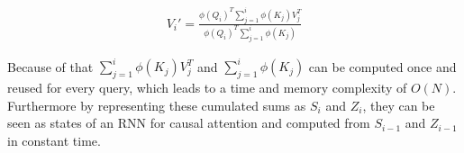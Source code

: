 \documentclass[DIV=13,fontsize=11pt]{scrartcl}
\begin{document}
\begin{align}
    V_{i}' {=} \frac{\phi(Q_{i})^T \sum_{j=1}^{i} \phi(K_{j})V_{j}^T}{\phi(Q_{i})^T \sum_{j=1}^{i}\phi(K_{j})}
\end{align}

Because of that \(\sum_{j=1}^{i} \phi(K_{j})V_{j}^T\) and \(\sum_{j=1}^{i}\phi(K_{j})\) can be computed once and reused for every query, which leads to a time and memory complexity of \(O(N)\). Furthermore by representing these cumulated sums as \(S_{i}\) and \(Z_{i}\), they can be seen as states of an RNN for causal attention and computed from \(S_{i-1}\) and \(Z_{i-1}\) in constant time.




\end{document}
